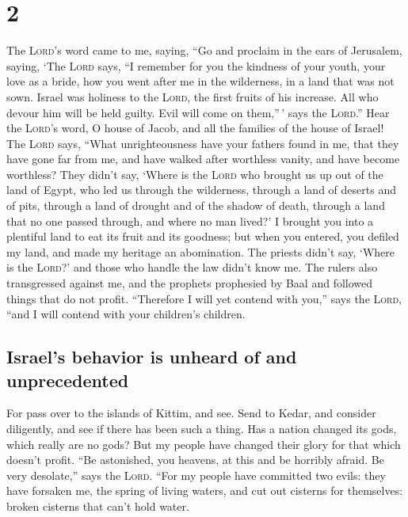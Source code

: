 \hypertarget{section-1}{%
\section{2}\label{section-1}}

 The \textsc{Lord}'s word came to me, saying,
 ``Go and proclaim in the ears of Jerusalem, saying, `The
\textsc{Lord} says, ``I remember for you the kindness of your youth,
your love as a bride, how you went after me in the wilderness, in a land
that was not sown.  Israel was holiness to the
\textsc{Lord}, the first fruits of his increase. All who devour him will
be held guilty. Evil will come on them,''\,' says the \textsc{Lord}.''
 Hear the \textsc{Lord}'s word, O house of Jacob, and all
the families of the house of Israel!  The \textsc{Lord}
says, ``What unrighteousness have your fathers found in me, that they
have gone far from me, and have walked after worthless vanity, and have
become worthless?  They didn't say, `Where is the
\textsc{Lord} who brought us up out of the land of Egypt, who led us
through the wilderness, through a land of deserts and of pits, through a
land of drought and of the shadow of death, through a land that no one
passed through, and where no man lived?'  I brought you
into a plentiful land to eat its fruit and its goodness; but when you
entered, you defiled my land, and made my heritage an abomination.
 The priests didn't say, `Where is the \textsc{Lord}?' and
those who handle the law didn't know me. The rulers also transgressed
against me, and the prophets prophesied by Baal and followed things that
do not profit.  ``Therefore I will yet contend with you,''
says the \textsc{Lord}, ``and I will contend with your children's
children.

\hypertarget{israels-behavior-is-unheard-of-and-unprecedented}{%
\subsection{Israel's behavior is unheard of and
unprecedented}\label{israels-behavior-is-unheard-of-and-unprecedented}}

 For pass over to the islands of Kittim, and see. Send to
Kedar, and consider diligently, and see if there has been such a thing.
 Has a nation changed its gods, which really are no gods?
But my people have changed their glory for that which doesn't profit.
 ``Be astonished, you heavens, at this and be horribly
afraid. Be very desolate,'' says the \textsc{Lord}. 
``For my people have committed two evils: they have forsaken me, the
spring of living waters, and cut out cisterns for themselves: broken
cisterns that can't hold water.

